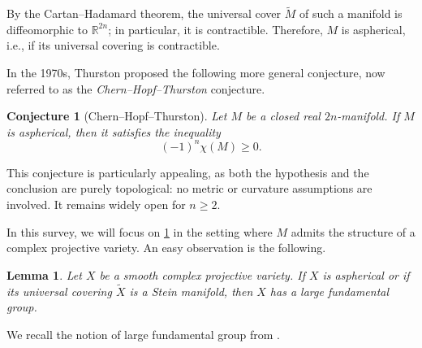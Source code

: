 \documentclass[english]{amsproc}
\theoremstyle{plain}
\newtheorem{lem}[thm]{Lemma}
\newtheorem{conjecture}[thm]{Conjecture}
\theoremstyle{definition}
\theoremstyle{remark}
\theoremstyle{plain}
\numberwithin{equation}{thm} %
\begin{document}
	By the Cartan--Hadamard theorem, the universal cover \(\widetilde{M}\) of such a manifold 
	is diffeomorphic to \(\mathbb{R}^{2n}\); in particular, it is contractible. 
	Therefore, \(M\) is aspherical, i.e.,  if its universal covering is contractible.
	
	In the 1970s, Thurston proposed the following more general conjecture, 
	now referred to as the \emph{Chern--Hopf--Thurston} conjecture.
	\begin{conjecture}[Chern--Hopf--Thurston]\label{conj:CHT}
		Let \(M\) be a closed real \(2n\)-manifold.  
		If \(M\) is aspherical, then it satisfies the inequality
		\[
		(-1)^n \chi(M)\geq 0.
		\]
	\end{conjecture}
	This conjecture is particularly appealing, as both the hypothesis and the conclusion 
	are purely topological: no metric or curvature assumptions are involved.  
	It remains widely open for \(n \geq 2\).
	
	In this survey, we will focus on \cref{conj:CHT} in the setting where \(M\) 
	admits the structure of a complex projective variety. An easy observation is the following.
	\begin{lem}\label{lem:asp}
		Let $X$ be a smooth complex projective variety. If $X$ is aspherical or if its universal covering $\widetilde{X}$ is a Stein manifold, then $X$ has a large fundamental group.
	\end{lem}
	
	We recall the notion of large fundamental group from \cite{Kol95}.
	
\end{document}
